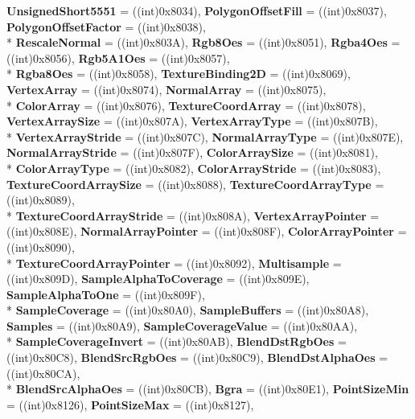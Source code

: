 \begin{DoxyCompactItemize}
{\bfseries Unsigned\-Short5551} = ((int)0x8034), 
{\bfseries Polygon\-Offset\-Fill} = ((int)0x8037), 
{\bfseries Polygon\-Offset\-Factor} = ((int)0x8038), 
\\*
{\bfseries Rescale\-Normal} = ((int)0x803\-A), 
{\bfseries Rgb8\-Oes} = ((int)0x8051), 
{\bfseries Rgba4\-Oes} = ((int)0x8056), 
{\bfseries Rgb5\-A1\-Oes} = ((int)0x8057), 
\\*
{\bfseries Rgba8\-Oes} = ((int)0x8058), 
{\bfseries Texture\-Binding2\-D} = ((int)0x8069), 
{\bfseries Vertex\-Array} = ((int)0x8074), 
{\bfseries Normal\-Array} = ((int)0x8075), 
\\*
{\bfseries Color\-Array} = ((int)0x8076), 
{\bfseries Texture\-Coord\-Array} = ((int)0x8078), 
{\bfseries Vertex\-Array\-Size} = ((int)0x807\-A), 
{\bfseries Vertex\-Array\-Type} = ((int)0x807\-B), 
\\*
{\bfseries Vertex\-Array\-Stride} = ((int)0x807\-C), 
{\bfseries Normal\-Array\-Type} = ((int)0x807\-E), 
{\bfseries Normal\-Array\-Stride} = ((int)0x807\-F), 
{\bfseries Color\-Array\-Size} = ((int)0x8081), 
\\*
{\bfseries Color\-Array\-Type} = ((int)0x8082), 
{\bfseries Color\-Array\-Stride} = ((int)0x8083), 
{\bfseries Texture\-Coord\-Array\-Size} = ((int)0x8088), 
{\bfseries Texture\-Coord\-Array\-Type} = ((int)0x8089), 
\\*
{\bfseries Texture\-Coord\-Array\-Stride} = ((int)0x808\-A), 
{\bfseries Vertex\-Array\-Pointer} = ((int)0x808\-E), 
{\bfseries Normal\-Array\-Pointer} = ((int)0x808\-F), 
{\bfseries Color\-Array\-Pointer} = ((int)0x8090), 
\\*
{\bfseries Texture\-Coord\-Array\-Pointer} = ((int)0x8092), 
{\bfseries Multisample} = ((int)0x809\-D), 
{\bfseries Sample\-Alpha\-To\-Coverage} = ((int)0x809\-E), 
{\bfseries Sample\-Alpha\-To\-One} = ((int)0x809\-F), 
\\*
{\bfseries Sample\-Coverage} = ((int)0x80\-A0), 
{\bfseries Sample\-Buffers} = ((int)0x80\-A8), 
{\bfseries Samples} = ((int)0x80\-A9), 
{\bfseries Sample\-Coverage\-Value} = ((int)0x80\-A\-A), 
\\*
{\bfseries Sample\-Coverage\-Invert} = ((int)0x80\-A\-B), 
{\bfseries Blend\-Dst\-Rgb\-Oes} = ((int)0x80\-C8), 
{\bfseries Blend\-Src\-Rgb\-Oes} = ((int)0x80\-C9), 
{\bfseries Blend\-Dst\-Alpha\-Oes} = ((int)0x80\-C\-A), 
\\*
{\bfseries Blend\-Src\-Alpha\-Oes} = ((int)0x80\-C\-B), 
{\bfseries Bgra} = ((int)0x80\-E1), 
{\bfseries Point\-Size\-Min} = ((int)0x8126), 
{\bfseries Point\-Size\-Max} = ((int)0x8127), 

\end{DoxyCompactItemize}

